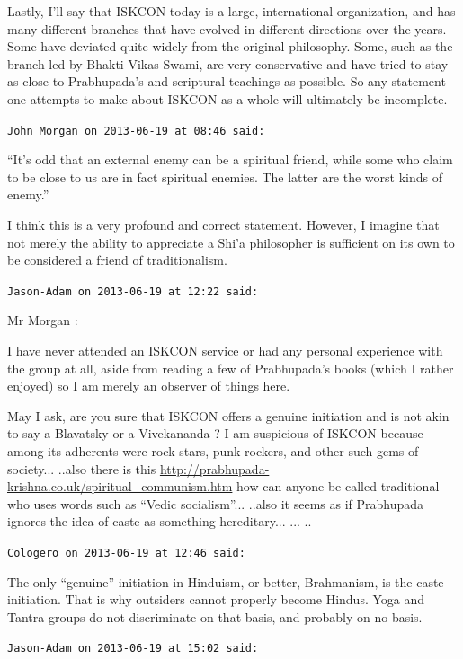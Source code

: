 \begin{footnotesize}
\begin{sffamily}
Lastly, I'll say that ISKCON today is a large, international organization, and has many different branches that have evolved in different directions over the years. Some have deviated quite widely from the original philosophy. Some, such as the branch led by Bhakti Vikas Swami, are very conservative and have tried to stay as close to Prabhupada's and scriptural teachings as possible. So any statement one attempts to make about ISKCON as a whole will ultimately be incomplete.

\hfill

\texttt{John Morgan on 2013-06-19 at 08:46 said:}

``It's odd that an external enemy can be a spiritual friend, while some who claim to be close to us are in fact spiritual enemies. The latter are the worst kinds of enemy.''

I think this is a very profound and correct statement. However, I imagine that not merely the ability to appreciate a Shi'a philosopher is sufficient on its own to be considered a friend of traditionalism.

\hfill

\texttt{Jason-Adam on 2013-06-19 at 12:22 said:}

Mr Morgan :

I have never attended an ISKCON service or had any personal experience with the group at all, aside from reading a few of Prabhupada's books (which I rather enjoyed) so I am merely an observer of things here.

May I ask, are you sure that ISKCON offers a genuine initiation and is not akin to say a Blavatsky or a Vivekananda ? I am suspicious of ISKCON because among its adherents were rock stars, punk rockers, and other such gems of society... ..also there is this \url{http://prabhupada-krishna.co.uk/spiritual\_communism.htm} how can anyone be called traditional who uses words such as ``Vedic socialism''... ..also it seems as if Prabhupada ignores the idea of caste as something hereditary... ... ..

\hfill

\texttt{Cologero on 2013-06-19 at 12:46 said:}

The only ``genuine'' initiation in Hinduism, or better, Brahmanism, is the caste initiation. That is why outsiders cannot properly become Hindus. Yoga and Tantra groups do not discriminate on that basis, and probably on no basis.

\hfill

\texttt{Jason-Adam on 2013-06-19 at 15:02 said:}


\end{sffamily}
\end{footnotesize}
